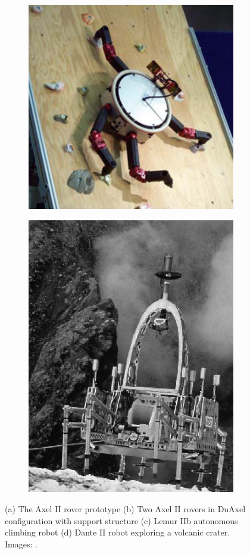 \documentclass[12pt]{article}
\begin{document}
\begin{figure}
\begin{subfigure}{.245\textwidth}
    \includegraphics[width=.88\linewidth]{lemur_prototype}
    \caption{}
    \label{fig:lemur}
  \end{subfigure}%
  \begin{subfigure}{.245\textwidth}
    \centering
    \includegraphics[width=.65\linewidth]{dante_prototype}
    \caption{}
    \label{fig:dante}
  \end{subfigure}  %
  \label{fig:prototypes}
  \vspace{-0.1in}
  \caption{(a) The Axel II rover prototype (b) Two Axel II rovers in DuAxel configuration 
  with support structure (c) Lemur IIb autonomous climbing robot (d) Dante II robot exploring a 
  volcanic crater. Images: \cite{duaxel, lemur_design, dante_results}.}
\end{figure}
\end{document}
